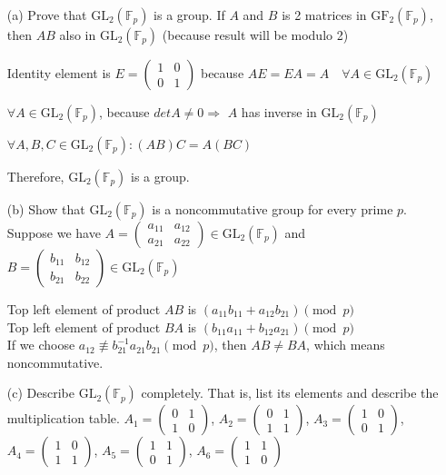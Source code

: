 \begin{exer}[2.15]
\begin{enumerate}
    \item [(a)] Prove that $\text{GL}_2(\mathbb{F}_p)$ is a group.
    If $A$ and $B$ is 2 matrices in $\text{GF}_2(\mathbb{F}_p)$, then $AB$ also in $\text{GL}_2(\mathbb{F}_p)$ (because result will be modulo 2)
    
    Identity element is $E = \begin{pmatrix}1 & 0\\0 & 1\end{pmatrix}$ because $AE=EA=A \quad \forall A \in \text{GL}_2(\mathbb{F}_p)$
    
    $\forall A \in \text{GL}_2(\mathbb{F}_p)$, because $detA \neq 0 \Rightarrow$ $A$ has inverse in $\text{GL}_2(\mathbb{F}_p)$
    
    $\forall A, B, C \in \text{GL}_2(\mathbb{F}_p): (AB)C=A(BC)$
    
    Therefore, $\text{GL}_2(\mathbb{F}_p)$ is a group.
    \item [(b)] Show that $\text{GL}_2(\mathbb{F}_p)$ is a noncommutative group for every prime $p$.
    Suppose we have $A = \begin{pmatrix}a_{11} & a_{12} \\ a_{21} & a_{22}\end{pmatrix} \in \text{GL}_2(\mathbb{F}_p)$ and $B=\begin{pmatrix}b_{11} & b_{12} \\ b_{21} & b_{22}\end{pmatrix} \in \text{GL}_2(\mathbb{F}_p)$
    
    Top left element of product $AB$ is $(a_{11}b_{11}+a_{12}b_{21}) \pmod p$ \\ Top left element of product $BA$ is $(b_{11}a_{11} + b_{12}a_{21}) \pmod p$ \\ If we choose $a_{12} \not\equiv b_{21}^{-1}a_{21}b_{21} \pmod p$, then $AB \neq BA$, which means noncommutative.
    \item [(c)] Describe $\text{GL}_2(\mathbb{F}_p)$ completely. That is, list its elements and describe the multiplication table.
    $A_1 = \begin{pmatrix}0 & 1\\1 & 0\end{pmatrix}$, $A_2 = \begin{pmatrix}0 & 1\\1 & 1\end{pmatrix}$, $A_3 = \begin{pmatrix}1 & 0\\0 & 1\end{pmatrix}$, $A_4 = \begin{pmatrix}1 & 0\\1 & 1\end{pmatrix}$, $A_5 = \begin{pmatrix}1 & 1\\0 & 1\end{pmatrix}$, $A_6 = \begin{pmatrix}1 & 1\\1 & 0\end{pmatrix}$
    

\end{enumerate}
\end{exer}
